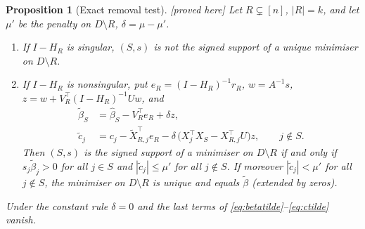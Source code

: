 \documentclass[10pt,a4paper]{article}
\theoremstyle{plain}
\newtheorem{proposition}[theorem]{Proposition}
\theoremstyle{definition}
\theoremstyle{remark}
\newcommand{\status}[1]{\textnormal{\textsf{\small [#1]}}}
\newcommand{\Dm}{D\setminus R}
\begin{document}
\begin{proposition}[Exact removal test]\label{prop:exact}\status{proved here}
Let $R\subsetneq[n]$, $|R|=k$, and let $\mu'$ be the penalty on $\Dm$, $\delta=\mu-\mu'$.
\begin{enumerate}[label=(\alph*),leftmargin=2em]
\item If $I-H_R$ is singular, $(S,s)$ is not the signed support of a unique minimiser on $\Dm$.
\item If $I-H_R$ is nonsingular, put $e_R=(I-H_R)^{-1}r_R$, $w=A^{-1}s$, $z=w+V_R^{\top}(I-H_R)^{-1}Uw$, and
\begin{align}
\tilde\beta_S&=\hat\beta_S-V_R^{\top}e_R+\delta z,\label{eq:betatilde}\\
\tilde c_j&=c_j-\tilde X_{R,j}^{\top}e_R-\delta\,\bigl(X_j^{\top}X_S-X_{R,j}^{\top}U\bigr)z,\qquad j\notin S.\label{eq:ctilde}
\end{align}
Then $(S,s)$ is the signed support of a minimiser on $\Dm$ if and only if $s_j\tilde\beta_j>0$ for all $j\in S$ and $|\tilde c_j|\le\mu'$ for all $j\notin S$. If moreover $|\tilde c_j|<\mu'$ for all $j\notin S$, the minimiser on $\Dm$ is unique and equals $\tilde\beta$ (extended by zeros).
\end{enumerate}
Under the constant rule $\delta=0$ and the last terms of \eqref{eq:betatilde}--\eqref{eq:ctilde} vanish.
\end{proposition}
\end{document}
